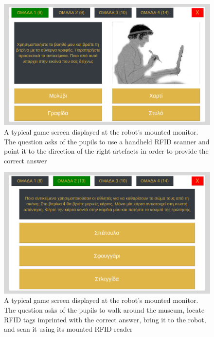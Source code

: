 \begin{figure}[H]\centering
  \includegraphics[scale=0.4]{images/cultureid/sc4.png}
  \caption{\small A typical game screen displayed at the robot's mounted
           monitor. The question asks of the pupils to use a handheld RFID
           scanner and point it to the direction of the right artefacts in
           order to provide the correct answer}
  \label{fig:cultureid_sc4}
\end{figure}
\begin{figure}[H]\centering
  \includegraphics[scale=0.4]{images/cultureid/sc8.png}
  \caption{\small A typical game screen displayed at the robot's mounted
           monitor. The question asks of the pupils to walk around the museum,
           locate RFID tags imprinted with the correct answer, bring it to the
           robot, and scan it using its mounted RFID reader}
  \label{fig:cultureid_sc8}
\end{figure}

